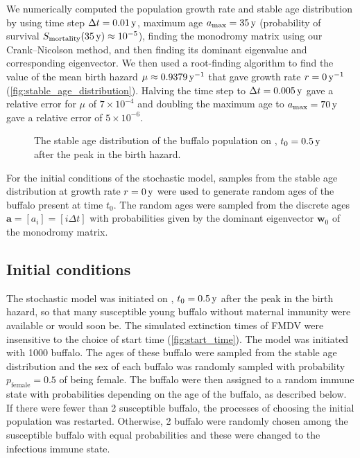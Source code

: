 \documentclass[12pt, UKenglish]{article}  %
\renewcommand{\vec}[1]{\mathbf{#1}}
\begin{document}
We numerically computed the population growth rate and stable age
distribution by using time step $\Delta t = \unit[0.01]{y}$,
maximum age $a_{\text{max}} = \unit[35]{y}$
(probability of survival
$S_{\text{mortality}}(\unit[35]{y}) \approx 10^{-5}$),
finding the monodromy matrix using our Crank--Nicolson method, and
then finding its dominant eigenvalue and corresponding eigenvector.
We then used a root-finding algorithm to find the value of the mean
birth hazard $\mu \approx \unit[0.9379]{y^{-1}}$ that gave growth rate
$r = \unit[0]{y^{-1}}$
(\autoref{fig:stable_age_distribution}). Halving the time step to
$\Delta t = \unit[0.005]{y}$ gave a relative error for $\mu$
of $7 \times 10^{-4}$ and doubling the maximum age to $a_{\text{max}}
= \unit[70]{y}$ gave a relative error of $5 \times 10^{-6}$.

\begin{figure}
  \centering
  \begin{sansmath}
    
  \end{sansmath}
  \caption{The stable age distribution of the buffalo population
    on {\printyearoff{}}, $t_0 = \unit[0.5]{y}$
    after the peak in the birth hazard.}
  \label{fig:stable_age_distribution}
\end{figure}

For the initial conditions of the stochastic model, samples from the
stable age distribution at growth rate $r = \unit[0]{y}$ were used to
generate random ages of the buffalo present at time $t_0$. The random ages
were sampled from the discrete ages $\vec{a} = [a_i] = [i \Delta t]$
with probabilities given by the dominant eigenvector $\vec{w}_0$ of
the monodromy matrix.


\subsection{Initial conditions}
\label{initial_conditions}

The stochastic model was initiated on
{\printyearoff{}}, $t_0 = \unit[0.5]{y}$ after the
peak in the birth hazard, so that many susceptible young buffalo
without maternal immunity were available or would soon be. The
simulated extinction times of FMDV were insensitive to the choice of
start time (\autoref{fig:start_time}). The model was initiated with
1000 buffalo. The ages of these buffalo were sampled from the stable
age distribution and the sex of each buffalo was randomly sampled with
probability $p_{\text{female}} = 0.5$ of being female. The buffalo
were then assigned to a random immune state with probabilities
depending on the age of the buffalo, as described below. If there were
fewer than 2 susceptible buffalo, the processes of choosing the
initial population was restarted. Otherwise, 2 buffalo were randomly
chosen among the susceptible buffalo with equal probabilities and
these were changed to the infectious immune state.
\end{document}
